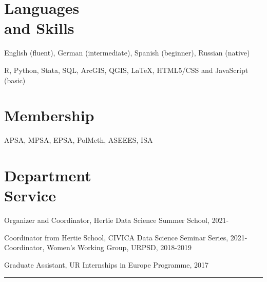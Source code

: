 \documentclass[margin,line,10.95pt]{res}
\begin{document}
\begin{resume}
\section{\sc Languages \\ and Skills}
English (fluent), German (intermediate), Spanish (beginner), Russian (native)
\vspace*{-4.5mm}

R, Python, Stata, SQL, ArcGIS, QGIS, \LaTeX , HTML5/CSS and JavaScript (basic) 
\vspace*{-2.5mm}

\section{\sc Membership}

APSA, MPSA, EPSA, PolMeth, ASEEES, ISA

\section{\sc Department \\ Service}
Organizer and Coordinator, Hertie Data Science Summer School, 2021-
\vspace*{-4.5mm}

Coordinator from Hertie School, CIVICA Data Science Seminar Series, 2021-
\\
Coordinator, Women's Working Group,  URPSD,  2018-2019
\vspace*{-4.5mm}

Graduate Assistant, UR Internships in Europe Programme,  2017

\begin{center}
	\noindent\rule{8cm}{0.4pt}
\end{center}
\vspace{1em}


\end{resume}
\end{document}

